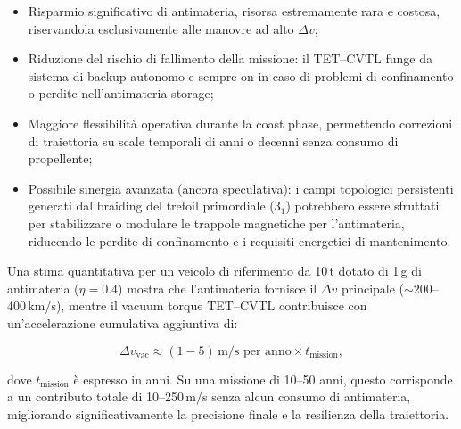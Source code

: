 \documentclass[11pt,a4paper]{article}
\theoremstyle{plain}
\theoremstyle{definition}
\begin{document}
\vspace{0.2cm}
\begin{itemize}
    \item Risparmio significativo di antimateria, risorsa estremamente rara e costosa, riservandola esclusivamente alle manovre ad alto $\Delta v$;

    \vspace{0.2cm}
    \item Riduzione del rischio di fallimento della missione: il TET--CVTL funge da sistema di backup autonomo e sempre-on in caso di problemi di confinamento o perdite nell’antimateria storage;

    \vspace{0.2cm}
    \item Maggiore flessibilità operativa durante la coast phase, permettendo correzioni di traiettoria su scale temporali di anni o decenni senza consumo di propellente;

    \vspace{0.2cm}
    \item Possibile sinergia avanzata (ancora speculativa): i campi topologici persistenti generati dal braiding del trefoil primordiale ($3_1$) potrebbero essere sfruttati per stabilizzare o modulare le trappole magnetiche per l’antimateria, riducendo le perdite di confinamento e i requisiti energetici di mantenimento.
\end{itemize}

\vspace{0.4cm}

Una stima quantitativa per un veicolo di riferimento da 10\,t dotato di 1\,\textmu g di antimateria ($\eta = 0.4$) mostra che l’antimateria fornisce il $\Delta v$ principale ($\sim$200--400\,km/s), mentre il vacuum torque TET--CVTL contribuisce con un’accelerazione cumulativa aggiuntiva di:


\vspace{0.2cm}
\begin{equation}
\Delta v_{\text{vac}} \approx (1 - 5)\,\text{m/s per anno} \times t_{\text{mission}},
\label{eq:dv_vac_antimatter}
\end{equation}


\vspace{0.3cm}
dove $t_{\text{mission}}$ è espresso in anni. Su una missione di 10--50 anni, questo corrisponde a un contributo totale di 10--250\,m/s senza alcun consumo di antimateria, migliorando significativamente la precisione finale e la resilienza della traiettoria.
\end{document}
